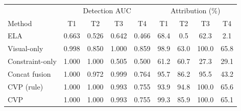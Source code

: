 \begin{tabular}{lcccc|cccc}
\toprule
 & \multicolumn{4}{c|}{Detection AUC} & \multicolumn{4}{c}{Attribution (\%)}\\
Method & T1 & T2 & T3 & T4 & T1 & T2 & T3 & T4\\
\midrule
ELA & 0.663 & 0.526 & 0.642 & 0.466 & 68.4 & 0.5 & 62.3 & 2.1\\
Visual-only & 0.998 & 0.850 & 1.000 & 0.859 & 98.9 & 63.0 & 100.0 & 65.8\\
Constraint-only & 1.000 & 1.000 & 0.505 & 0.500 & 61.2 & 60.7 & 27.3 & 29.1\\
Concat fusion & 1.000 & 0.972 & 0.999 & 0.764 & 95.7 & 86.2 & 95.5 & 43.2\\
CVP (rule) & 1.000 & 1.000 & 0.993 & 0.755 & 93.9 & 94.8 & 100.0 & 65.6\\
CVP & 1.000 & 1.000 & 0.993 & 0.755 & 99.3 & 85.9 & 100.0 & 65.1\\
\bottomrule
\end{tabular}
